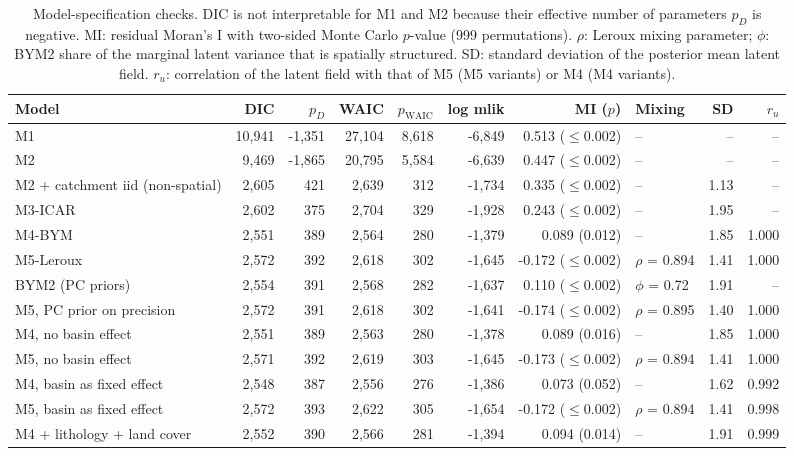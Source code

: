 \begin{table}[h]
\caption{Model-specification checks. DIC is not interpretable for M1 and M2 because their effective number of parameters $p_D$ is negative. MI: residual Moran's I with two-sided Monte Carlo $p$-value (999 permutations). $\rho$: Leroux mixing parameter; $\phi$: BYM2 share of the marginal latent variance that is spatially structured. SD: standard deviation of the posterior mean latent field. $r_u$: correlation of the latent field with that of M5 (M5 variants) or M4 (M4 variants).}\label{tabA7}
\footnotesize
\begin{tabular}{@{}lrrrrrrlrr@{}}
\toprule
Model & DIC & $p_D$ & WAIC & $p_{\mathrm{WAIC}}$ & log mlik & MI ($p$) & Mixing & SD & $r_u$ \\
\midrule
M1 & 10,941 & -1,351 & 27,104 & 8,618 & -6,849 & 0.513 ($\leq$0.002) & -- & -- & -- \\
M2 & 9,469 & -1,865 & 20,795 & 5,584 & -6,639 & 0.447 ($\leq$0.002) & -- & -- & -- \\
M2 + catchment iid (non-spatial) & 2,605 & 421 & 2,639 & 312 & -1,734 & 0.335 ($\leq$0.002) & -- & 1.13 & -- \\
M3-ICAR & 2,602 & 375 & 2,704 & 329 & -1,928 & 0.243 ($\leq$0.002) & -- & 1.95 & -- \\
M4-BYM & 2,551 & 389 & 2,564 & 280 & -1,379 & 0.089 (0.012) & -- & 1.85 & 1.000 \\
M5-Leroux & 2,572 & 392 & 2,618 & 302 & -1,645 & -0.172 ($\leq$0.002) & $\rho$ = 0.894 & 1.41 & 1.000 \\
BYM2 (PC priors) & 2,554 & 391 & 2,568 & 282 & -1,637 & 0.110 ($\leq$0.002) & $\phi$ = 0.72 & 1.91 & -- \\
M5, PC prior on precision & 2,572 & 391 & 2,618 & 302 & -1,641 & -0.174 ($\leq$0.002) & $\rho$ = 0.895 & 1.40 & 1.000 \\
M4, no basin effect & 2,551 & 389 & 2,563 & 280 & -1,378 & 0.089 (0.016) & -- & 1.85 & 1.000 \\
M5, no basin effect & 2,571 & 392 & 2,619 & 303 & -1,645 & -0.173 ($\leq$0.002) & $\rho$ = 0.894 & 1.41 & 1.000 \\
M4, basin as fixed effect & 2,548 & 387 & 2,556 & 276 & -1,386 & 0.073 (0.052) & -- & 1.62 & 0.992 \\
M5, basin as fixed effect & 2,572 & 393 & 2,622 & 305 & -1,654 & -0.172 ($\leq$0.002) & $\rho$ = 0.894 & 1.41 & 0.998 \\
M4 + lithology + land cover & 2,552 & 390 & 2,566 & 281 & -1,394 & 0.094 (0.014) & -- & 1.91 & 0.999 \\

\end{tabular}
\end{table}
